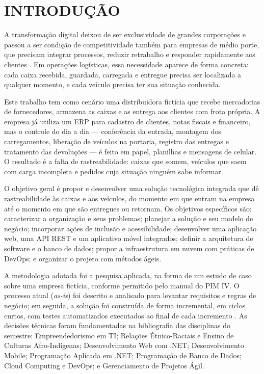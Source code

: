 \chapter{INTRODUÇÃO}

A transformação digital deixou de ser exclusividade de grandes corporações e passou a ser condição de competitividade também para empresas de médio porte, que precisam integrar processos, reduzir retrabalho e responder rapidamente aos clientes \cite{pressman2021}. Em operações logísticas, essa necessidade aparece de forma concreta: cada caixa recebida, guardada, carregada e entregue precisa ser localizada a qualquer momento, e cada veículo precisa ter sua situação conhecida.

Este trabalho tem como cenário uma distribuidora fictícia que recebe mercadorias de fornecedores, armazena as caixas e as entrega aos clientes com frota própria. A empresa já utiliza um ERP para cadastro de clientes, notas fiscais e financeiro, mas o controle do dia a dia --- conferência da entrada, montagem dos carregamentos, liberação de veículos na portaria, registro das entregas e tratamento das devoluções --- é feito em papel, planilhas e mensagens de celular. O resultado é a falta de rastreabilidade: caixas que somem, veículos que saem com carga incompleta e pedidos cuja situação ninguém sabe informar.

O objetivo geral é propor e desenvolver uma solução tecnológica integrada que dê rastreabilidade às caixas e aos veículos, do momento em que entram na empresa até o momento em que são entregues ou retornam. Os objetivos específicos são: caracterizar a organização e seus problemas; planejar a solução e seu modelo de negócio; incorporar ações de inclusão e acessibilidade; desenvolver uma aplicação web, uma API REST e um aplicativo móvel integrados; definir a arquitetura de software e o banco de dados; propor a infraestrutura em nuvem com práticas de DevOps; e organizar o projeto com métodos ágeis.

A metodologia adotada foi a pesquisa aplicada, na forma de um estudo de caso sobre uma empresa fictícia, conforme permitido pelo manual do PIM IV. O processo atual (\textit{as-is}) foi descrito e analisado para levantar requisitos e regras de negócio; em seguida, a solução foi construída de forma incremental, em ciclos curtos, com testes automatizados executados ao final de cada incremento \cite{sommerville2018}. As decisões técnicas foram fundamentadas na bibliografia das disciplinas do semestre: Empreendedorismo em TI; Relações Étnico-Raciais e Ensino de Culturas Afro-Indígenas; Desenvolvimento Web com .NET; Desenvolvimento Mobile; Programação Aplicada em .NET; Programação de Banco de Dados; Cloud Computing e DevOps; e Gerenciamento de Projetos Ágil.

